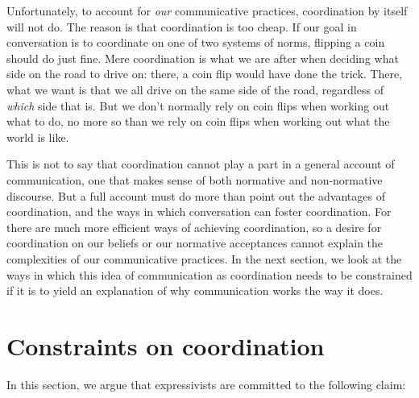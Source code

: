 \documentclass[11pt,article,oneside]{memoir}
\begin{document}
Unfortunately, to account for \emph{our} communicative practices, coordination by itself will not do. The reason is that coordination is too cheap. If our goal in conversation is to coordinate on one of two systems of norms, flipping a coin should do just fine.  Mere coordination is what we are after when deciding what side on the road to drive on: there, a coin flip would have done the trick. There, what we want is that we all drive on the same side of the road, regardless of \emph{which} side that is. But we don't normally rely on coin flips when working out what to do, no more so than we rely on coin flips when working out what the world is like. 

This is not to say that coordination cannot play a part in a general account of communication, one that makes sense of both normative and non-normative discourse. But a full account must do more than point out the advantages of coordination, and the ways in which conversation can foster coordination. For there are much more efficient ways of achieving coordination, so a desire for coordination on our beliefs or our normative acceptances cannot explain the complexities of our communicative practices. In the next section, we look at the ways in which this idea of communication as coordination needs to be constrained if it is to yield an explanation of why communication works the way it does. 





\section{Constraints on coordination}\label{coc}

In this section, we argue that expressivists are committed to the following claim: 
\end{document}
